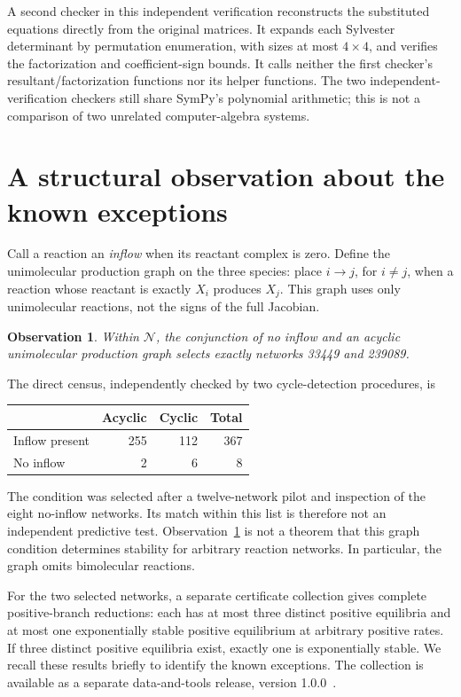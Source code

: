 \documentclass[11pt,a4paper]{article}
\newtheorem{observation}[theorem]{Observation}
\newcommand{\cN}{\mathcal N}
\begin{document}
A second checker in this independent verification reconstructs
the substituted equations directly from the original matrices.
It expands each Sylvester determinant by permutation enumeration,
with sizes at most $4\times4$, and verifies the factorization and
coefficient-sign bounds. It calls neither the first checker's
resultant/factorization functions nor its helper functions.
The two independent-verification checkers still share SymPy's
polynomial arithmetic; this is not a comparison of two unrelated
computer-algebra systems.

\section{A structural observation about the known exceptions}
Call a reaction an \emph{inflow} when its reactant complex is zero.
Define the unimolecular production graph on the three species:
place $i\to j$, for $i\ne j$, when a reaction whose reactant is
exactly $X_i$ produces $X_j$. This graph uses only unimolecular
reactions, not the signs of the full Jacobian.

\begin{observation}\label{obs:struct}
Within $\cN$, the conjunction of no inflow and an acyclic
unimolecular production graph selects exactly networks 33449
and 239089.
\end{observation}

The direct census, independently checked by two cycle-detection
procedures, is
\begin{center}
\begin{tabular}{@{}lrrr@{}}
\toprule
 & Acyclic & Cyclic & Total\\
\midrule
Inflow present & 255 & 112 & 367\\
No inflow & 2 & 6 & 8\\
\bottomrule
\end{tabular}
\end{center}
The condition was selected after a twelve-network pilot and
inspection of the eight no-inflow networks. Its match within
this list is therefore not an independent predictive test.
Observation~\ref{obs:struct} is not a theorem that this graph
condition determines stability for arbitrary reaction networks.
In particular, the graph omits bimolecular reactions.

For the two selected networks, a separate certificate collection
\cite{Adata} gives complete positive-branch reductions: each has
at most three distinct positive equilibria and at most one
exponentially stable positive equilibrium at arbitrary positive
rates. If three distinct positive equilibria exist, exactly one
is exponentially stable. We recall these results briefly to
identify the known exceptions. The collection is available as a
separate data-and-tools release, version 1.0.0~\cite{Adata}.
\end{document}
